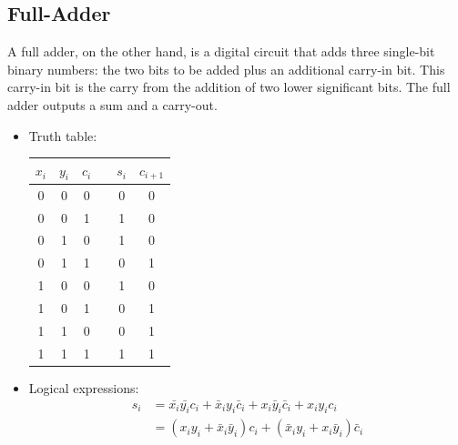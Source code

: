 \documentclass[12pt,openany, tikz,border=10pt]{book}
\begin{document}
			      	\subsection{Full-Adder}
			      	A full adder, on the other hand, is a digital circuit that adds three single-bit binary numbers: the two bits to be added plus an additional carry-in bit. This carry-in bit is the carry from the addition of two lower significant bits. The full adder outputs a sum and a carry-out.
			      	
			      	\begin{itemize}
			      		\item[] Truth table:
			      		      \begin{center}
			      		      	\begin{tabular}{cccc|cc}
			      		      		\( x_i \) & \( y_i \) & \( c_i \) &   & \( s_i \) & \( c_{i+1} \) \\
			      		      		\hline
			      		      		0         & 0         & 0         &   & 0         & 0             \\
			      		      		0         & 0         & 1         &   & 1         & 0             \\
			      		      		0         & 1         & 0         &   & 1         & 0             \\
			      		      		0         & 1         & 1         &   & 0         & 1             \\
			      		      		1         & 0         & 0         &   & 1         & 0             \\
			      		      		1         & 0         & 1         &   & 0         & 1             \\
			      		      		1         & 1         & 0         &   & 0         & 1             \\
			      		      		1         & 1         & 1         &   & 1         & 1             \\
			      		      	\end{tabular}
			      		      \end{center}
			      		\item[] Logical expressions:
			      		      \begin{align*}
			      		      	s_i     & = \bar{x_i}\bar{y_i} c_i + \bar{x}_i y_i \bar{c}_i + x_i \bar{y}_i \bar{c}_i + x_i y_i c_i \\
			      		      	        & = (x_i y_i + \bar{x}_i \bar{y}_i)c_i + (\bar{x}_i y_i + x_i \bar{y}_i)\bar{c}_i            \\

\end{align*}
\end{itemize}
\end{document}
